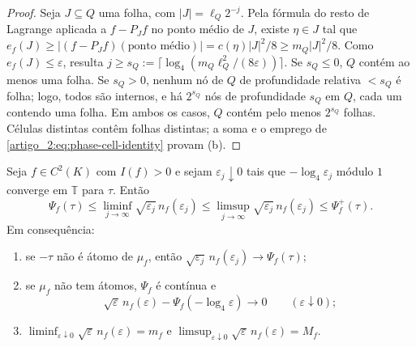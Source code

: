 \begin{proof}
Seja $J\subseteq Q$ uma folha, com $|J|=\ell_Q2^{-j}$. Pela fórmula do resto
de Lagrange aplicada a $f-P_Jf$ no ponto médio de $J$, existe $\eta\in J$
tal que
$e_f(J)\ge|(f-P_Jf)(\text{ponto médio})|=c(\eta)|J|^2/8\ge m_Q|J|^2/8$.
Como $e_f(J)\le\varepsilon$, resulta $j\ge s_Q:=\lceil\log_4(m_Q\ell_Q^2/(8\varepsilon))\rceil$.
Se $s_Q\le0$, $Q$ contém ao menos uma folha. Se $s_Q>0$, nenhum nó de $Q$ de
profundidade relativa $<s_Q$ é folha; logo, todos são internos, e há $2^{s_Q}$
nós de profundidade $s_Q$ em $Q$, cada um contendo uma folha. Em ambos os casos,
$Q$ contém pelo menos $2^{s_Q}$ folhas. Células distintas contêm folhas
distintas; a soma e o emprego de \eqref{artigo_2:eq:phase-cell-identity} provam (b).
\end{proof}

\begin{theorem}\label{map:artigo_2:12.7}
\label{artigo_2:thm:phase-law}
Seja $f\in C^2(K)$ com $I(f)>0$ e sejam $\varepsilon_j\downarrow0$ tais que
$-\log_4\varepsilon_j$ módulo $1$ converge em $\mathbb T$ para $\tau$. Então
\begin{equation}
 \Psi_f(\tau)\le\liminf_{j\to\infty}\sqrt{\varepsilon_j}\,n_f(\varepsilon_j)
 \le\limsup_{j\to\infty}\sqrt{\varepsilon_j}\,n_f(\varepsilon_j)\le\Psi_f^+(\tau).
 \label{artigo_2:eq:phase-law}
\end{equation}
Em consequência:
\begin{enumerate}[label=(\roman*)]
\item se $-\tau$ não é átomo de $\mu_f$, então
 $\sqrt{\varepsilon_j}\,n_f(\varepsilon_j)\to\Psi_f(\tau)$;
\item se $\mu_f$ não tem átomos, $\Psi_f$ é contínua e
 \[
  \sqrt\varepsilon\,n_f(\varepsilon)-\Psi_f(-\log_4\varepsilon)\to0
  \qquad(\varepsilon\downarrow0);
 \]
\item $\liminf_{\varepsilon\downarrow0}\sqrt\varepsilon\,n_f(\varepsilon)=m_f$ e
 $\limsup_{\varepsilon\downarrow0}\sqrt\varepsilon\,n_f(\varepsilon)=M_f$.
\end{enumerate}
\end{theorem}

